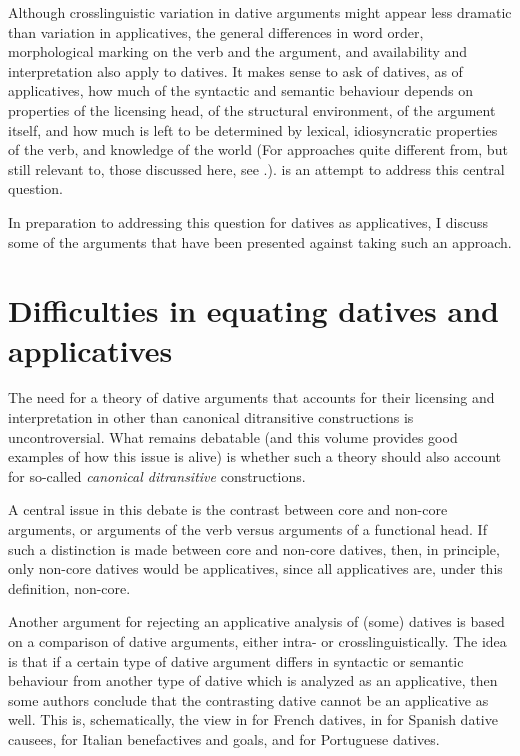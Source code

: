 \documentclass[output=paper,colorlinks,citecolor=brown,nonflat]{./langscibook}
\begin{document}
Although crosslinguistic variation in dative arguments might appear less dramatic than variation in applicatives, the general differences in word order, morphological marking on the verb and the argument, and availability and interpretation also apply to datives. It makes sense to ask of datives, as of applicatives, how much of the syntactic and semantic behaviour depends on properties of the licensing head, of the structural environment, of the argument itself, and how much is left to be determined by lexical, idiosyncratic properties of the verb, and knowledge of the world (For approaches quite different from, but still relevant to, those discussed here, see \citealt{Grimm2011, Maling2001}.).  is an attempt to address this central question. 

In preparation to addressing this question for datives as applicatives, I discuss some of the arguments that have been presented against taking such an approach.

\section{Difficulties in equating datives and applicatives}\label{sec:cuervo:2}

The need for a theory of dative arguments that accounts for their licensing and interpretation in other than canonical ditransitive constructions is uncontroversial. What remains debatable (and this volume provides good examples of how this issue is alive) is whether such a theory should also account for so-called \textit{canonical ditransitive} constructions. 

A central issue in this debate is the contrast between core and non-core arguments, or arguments of the verb versus arguments of a functional head. If such a distinction is made between core and non-core datives, then, in principle, only non-core datives would be applicatives, since all applicatives are, under this definition, non-core. 

Another argument for rejecting an applicative analysis of (some) datives is based on a comparison of dative arguments, either intra- or crosslinguistically. The idea is that if a certain type of dative argument differs in syntactic or semantic behaviour from another type of dative which is analyzed as an applicative, then some authors conclude that the contrasting dative cannot be an applicative as well. This is, schematically, the view in \citet{BonehNash2012} for French datives, in \citet{Tubino2012} for Spanish dative causees, \citet{FolliHarley2006} for Italian benefactives and goals, and  for Portuguese datives. 
\end{document}
